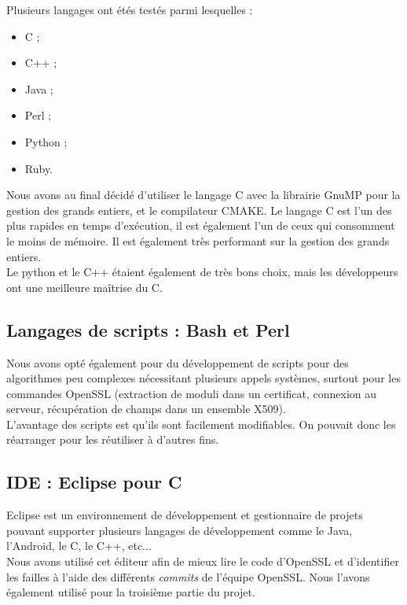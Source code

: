 Plusieurs langages ont étés testés parmi lesquelles :
\begin{itemize}
\item C ;
\item C++ ;
\item Java ;
\item Perl ;
\item Python ;
\item Ruby.\\
\end{itemize}

Nous avons au final décidé d'utiliser le langage C avec la librairie GnuMP \cite{gmplib} pour la gestion des grands entiers, et le compilateur CMAKE. Le langage C est l'un des plus rapides en temps d'exécution, il est également l'un de ceux qui consomment le moins de mémoire. Il est également très performant sur la gestion des grands entiers.\\

Le python et le C++ étaient également de très bons choix, mais les développeurs ont une meilleure maîtrise du C.

\subsection{Langages de scripts : Bash et Perl}

Nous avons opté également pour du développement de scripts pour des algorithmes peu complexes nécessitant plusieurs appels systèmes, surtout pour les commandes OpenSSL (extraction de moduli dans un certificat, connexion au serveur, récupération de champs dans un ensemble X509).\\

L'avantage des scripts est qu'ils sont facilement modifiables. On pouvait donc les réarranger pour les réutiliser à d'autres fins.

\subsection{IDE : Eclipse pour C}

Eclipse est un environnement de développement et gestionnaire de projets pouvant supporter plusieurs langages de développement comme le Java, l'Android, le C, le C++, etc...\\


Nous avons utilisé cet éditeur afin de mieux lire le code d'OpenSSL et d'identifier les failles à l'aide des différents \textit{commits} de l'équipe OpenSSL. Nous l'avons également utilisé pour la troisième partie du projet.

